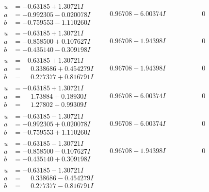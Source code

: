 \documentclass[1p]{elsarticle_modified}
\theoremstyle{definition}
\begin{document}
$$\begin{array}{c|c|c}
 \hline 
\begin{aligned}
u &= -0.63185 + 1.30721 I \\
a &= -0.992305 - 0.020078 I \\
b &= -0.759553 - 1.110260 I\end{aligned}
 & \phantom{-}0.96708 - 6.00374 I & \phantom{-0.000000 } 0 \\ \hline\begin{aligned}
u &= -0.63185 + 1.30721 I \\
a &= -0.858500 + 0.107627 I \\
b &= -0.435140 - 0.309198 I\end{aligned}
 & \phantom{-}0.96708 - 1.94398 I & \phantom{-0.000000 } 0 \\ \hline\begin{aligned}
u &= -0.63185 + 1.30721 I \\
a &= \phantom{-}0.338686 + 0.454279 I \\
b &= \phantom{-}0.277377 + 0.816791 I\end{aligned}
 & \phantom{-}0.96708 - 1.94398 I & \phantom{-0.000000 } 0 \\ \hline\begin{aligned}
u &= -0.63185 + 1.30721 I \\
a &= \phantom{-}1.73884 + 0.18930 I \\
b &= \phantom{-}1.27802 + 0.99309 I\end{aligned}
 & \phantom{-}0.96708 - 6.00374 I & \phantom{-0.000000 } 0 \\ \hline\begin{aligned}
u &= -0.63185 - 1.30721 I \\
a &= -0.992305 + 0.020078 I \\
b &= -0.759553 + 1.110260 I\end{aligned}
 & \phantom{-}0.96708 + 6.00374 I & \phantom{-0.000000 } 0 \\ \hline\begin{aligned}
u &= -0.63185 - 1.30721 I \\
a &= -0.858500 - 0.107627 I \\
b &= -0.435140 + 0.309198 I\end{aligned}
 & \phantom{-}0.96708 + 1.94398 I & \phantom{-0.000000 } 0 \\ \hline\begin{aligned}
u &= -0.63185 - 1.30721 I \\
a &= \phantom{-}0.338686 - 0.454279 I \\
b &= \phantom{-}0.277377 - 0.816791 I\end{aligned}

\end{array}$$
\end{document}
